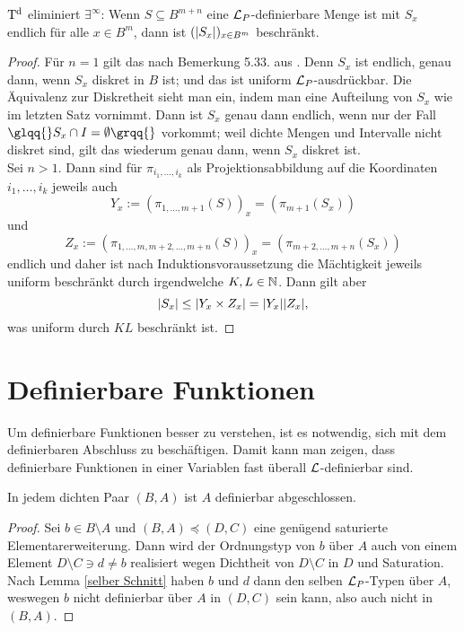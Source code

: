 \begin{lemma}
	$\operatorname{T^d}$ eliminiert $\exists^\infty$: Wenn $S\subseteq B^{m+n}$ eine $\mathcal{L}_P$-definierbare Menge ist mit $S_x$ endlich für alle $x\in B^m$, dann ist $({\left| S_x \right|})_{x\in B^m}$ beschränkt.
\end{lemma}
\begin{proof}
	Für $n=1$ gilt das nach Bemerkung 5.33. aus \cite{Lukas}. Denn $S_x$ ist endlich, genau dann, wenn $S_x$ diskret in $B$ ist; und das ist uniform $\mathcal{L}_P$-ausdrückbar. Die Äquivalenz zur Diskretheit sieht man ein, indem man eine Aufteilung von $S_x$ wie im letzten Satz vornimmt. Dann ist $S_x$ genau dann endlich, wenn nur der Fall $\glqq{}S_x\cap I=\emptyset\grqq{}$ vorkommt; weil dichte Mengen und Intervalle nicht diskret sind, gilt das wiederum genau dann, wenn $S_x$ diskret ist.\\
	Sei $n>1$. Dann sind für $\pi_{i_1,\dots,i_k}$ als Projektionsabbildung auf die Koordinaten $i_1,\dots,i_k$ jeweils auch $$Y_x:=(\pi_{1,\dots,m+1}(S))_x=(\pi_{m+1}(S_x))$$ und $$Z_x:=(\pi_{1,\dots,m,m+2,\dots,m+n}(S))_x=(\pi_{m+2,\dots,m+n}(S_x))$$ endlich und daher ist nach Induktionsvoraussetzung die Mächtigkeit jeweils uniform beschränkt durch irgendwelche $K,L\in\mathbb{N}$. Dann gilt aber $${\left| S_x \right|}\leq {\left| Y_x\times Z_x \right|}={\left| Y_x \right|}{\left| Z_x \right|},$$ was uniform durch $KL$ beschränkt ist.
\end{proof}

\section{Definierbare Funktionen}
Um definierbare Funktionen besser zu verstehen, ist es notwendig, sich mit dem definierbaren Abschluss zu beschäftigen. Damit kann man zeigen, dass definierbare Funktionen in einer Variablen \glqq{}fast überall\grqq{} $\mathcal{L}$-definierbar sind.

\begin{lemma}\label{A definierbar abgeschl}
	In jedem dichten Paar $(B,A)$ ist $A$ definierbar abgeschlossen.
\end{lemma}
\begin{proof}
	Sei $b\in B\setminus A$ und $(B,A)\preceq(D,C)$ eine genügend saturierte Elementarerweiterung. Dann wird der Ordnungstyp von $b$ über $A$ auch von einem Element $D\setminus C\ni d\neq b$ realisiert wegen Dichtheit von $D\setminus C$ in $D$ und Saturation.\\
	Nach Lemma \ref{selber Schnitt} haben $b$ und $d$ dann den selben $\mathcal{L}_P$-Typen über $A$, weswegen $b$ nicht definierbar über $A$ in $(D,C)$ sein kann, also auch nicht in $(B,A)$.
\end{proof}

